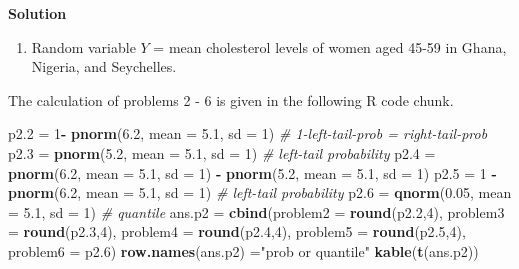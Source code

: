 \documentclass[
]{book}
\newenvironment{Shaded}{\begin{snugshade}}{\end{snugshade}}
\newcommand{\AttributeTok}[1]{\textcolor[rgb]{0.13,0.29,0.53}{#1}}
\newcommand{\CommentTok}[1]{\textcolor[rgb]{0.56,0.35,0.01}{\textit{#1}}}
\newcommand{\DecValTok}[1]{\textcolor[rgb]{0.00,0.00,0.81}{#1}}
\newcommand{\FloatTok}[1]{\textcolor[rgb]{0.00,0.00,0.81}{#1}}
\newcommand{\FunctionTok}[1]{\textcolor[rgb]{0.13,0.29,0.53}{\textbf{#1}}}
\newcommand{\NormalTok}[1]{#1}
\newcommand{\OtherTok}[1]{\textcolor[rgb]{0.56,0.35,0.01}{#1}}
\newcommand{\SpecialCharTok}[1]{\textcolor[rgb]{0.81,0.36,0.00}{\textbf{#1}}}
\newcommand{\StringTok}[1]{\textcolor[rgb]{0.31,0.60,0.02}{#1}}
\providecommand{\tightlist}{%
  \setlength{\itemsep}{0pt}\setlength{\parskip}{0pt}}
\begin{document}
\textbf{Solution}

\begin{enumerate}
\def\labelenumi{\arabic{enumi}.}
\tightlist
\item
  Random variable \(Y\) = mean cholesterol levels of women aged 45-59 in Ghana, Nigeria, and Seychelles.
\end{enumerate}

The calculation of problems 2 - 6 is given in the following R code chunk.

\begin{Shaded}
\begin{Highlighting}[]
\NormalTok{p2}\FloatTok{.2} \OtherTok{=} \DecValTok{1}\SpecialCharTok{{-}} \FunctionTok{pnorm}\NormalTok{(}\FloatTok{6.2}\NormalTok{, }\AttributeTok{mean =} \FloatTok{5.1}\NormalTok{, }\AttributeTok{sd =} \DecValTok{1}\NormalTok{)      }\CommentTok{\# 1{-}left{-}tail{-}prob = right{-}tail{-}prob}
\NormalTok{p2}\FloatTok{.3} \OtherTok{=} \FunctionTok{pnorm}\NormalTok{(}\FloatTok{5.2}\NormalTok{, }\AttributeTok{mean =} \FloatTok{5.1}\NormalTok{, }\AttributeTok{sd =} \DecValTok{1}\NormalTok{)         }\CommentTok{\# left{-}tail probability}
\NormalTok{p2}\FloatTok{.4} \OtherTok{=} \FunctionTok{pnorm}\NormalTok{(}\FloatTok{6.2}\NormalTok{, }\AttributeTok{mean =} \FloatTok{5.1}\NormalTok{, }\AttributeTok{sd =} \DecValTok{1}\NormalTok{) }\SpecialCharTok{{-}}  \FunctionTok{pnorm}\NormalTok{(}\FloatTok{5.2}\NormalTok{, }\AttributeTok{mean =} \FloatTok{5.1}\NormalTok{, }\AttributeTok{sd =} \DecValTok{1}\NormalTok{)    }
\NormalTok{p2}\FloatTok{.5} \OtherTok{=} \DecValTok{1} \SpecialCharTok{{-}}\FunctionTok{pnorm}\NormalTok{(}\FloatTok{6.2}\NormalTok{, }\AttributeTok{mean =} \FloatTok{5.1}\NormalTok{, }\AttributeTok{sd =} \DecValTok{1}\NormalTok{)      }\CommentTok{\# left{-}tail probability}
\NormalTok{p2}\FloatTok{.6} \OtherTok{=} \FunctionTok{qnorm}\NormalTok{(}\FloatTok{0.05}\NormalTok{, }\AttributeTok{mean =} \FloatTok{5.1}\NormalTok{, }\AttributeTok{sd =} \DecValTok{1}\NormalTok{)      }\CommentTok{\# quantile}
\NormalTok{ans.p2 }\OtherTok{=} \FunctionTok{cbind}\NormalTok{(}\AttributeTok{problem2 =} \FunctionTok{round}\NormalTok{(p2}\FloatTok{.2}\NormalTok{,}\DecValTok{4}\NormalTok{), }\AttributeTok{problem3 =}  \FunctionTok{round}\NormalTok{(p2}\FloatTok{.3}\NormalTok{,}\DecValTok{4}\NormalTok{), }
               \AttributeTok{problem4 =} \FunctionTok{round}\NormalTok{(p2}\FloatTok{.4}\NormalTok{,}\DecValTok{4}\NormalTok{), }\AttributeTok{problem5 =}  \FunctionTok{round}\NormalTok{(p2}\FloatTok{.5}\NormalTok{,}\DecValTok{4}\NormalTok{), }
               \AttributeTok{problem6 =}\NormalTok{ p2}\FloatTok{.6}\NormalTok{)}
\FunctionTok{row.names}\NormalTok{(ans.p2) }\OtherTok{=}\StringTok{"prob or quantile"}
\FunctionTok{kable}\NormalTok{(}\FunctionTok{t}\NormalTok{(ans.p2))}
\end{Highlighting}
\end{Shaded}
\end{document}
